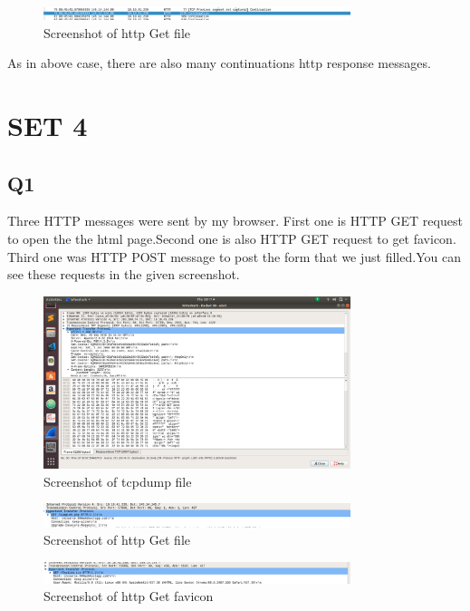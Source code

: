 \documentclass{article}
\begin{document}
   \begin{figure}[H]
 \centering
 \includegraphics[width=0.8\textwidth]{../Set3/q4/a2.png}
 \caption{\label{fig:PING}Screenshot of http Get file}
 \end{figure}
 
 As in above case, there are also many continuations http response messages.\\
\section{SET 4}

\subsection{Q1}
Three HTTP messages were sent by my browser. First one is HTTP GET request
to open the the html page.Second one is also HTTP GET request to get favicon. Third one was HTTP POST message to post the form that we just filled.You can see these requests in the given screenshot.\\

 \begin{figure}[H]
 \centering
 \includegraphics[width=0.8\textwidth]{../Set5/q1/a.png}
 \caption{\label{fig:PING}Screenshot of tcpdump file}
 \end{figure}
 
  \begin{figure}[H]
 \centering
 \includegraphics[width=0.8\textwidth]{../Set4/a.png}
 \caption{\label{fig:PING}Screenshot of http Get file}
 \end{figure}
 
  \begin{figure}[H]
 \centering
 \includegraphics[width=0.8\textwidth]{../Set4/b.png}
 \caption{\label{fig:PING}Screenshot of http Get favicon}
 \end{figure}
 
\end{document}
